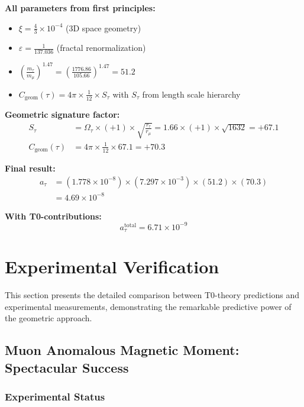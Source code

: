 \documentclass[12pt,a4paper]{article}
\numberwithin{equation}{section}
\newcommand{\xipar}{\xi}
\newcommand{\epsilonT}{\varepsilon}
\newcommand{\Cgeom}{C_{\text{geom}}}
\newcommand{\Omegafactor}{\Omega}
\begin{document}
	\textbf{All parameters from first principles:}
	\begin{itemize}
		\item $\xipar = \frac{4}{3} \times 10^{-4}$ (3D space geometry)
		\item $\epsilonT = \frac{1}{137.036}$ (fractal renormalization)
		\item $\left(\frac{m_\tau}{m_\mu}\right)^{1.47} = \left(\frac{1776.86}{105.66}\right)^{1.47} = 51.2$
		\item $\Cgeom(\tau) = 4\pi \times \frac{1}{12} \times S_\tau$ with $S_\tau$ from length scale hierarchy
	\end{itemize}
	
	\textbf{Geometric signature factor:}
	\begin{align}
		S_\tau &= \Omegafactor_\tau \times (+1) \times \sqrt{\frac{r_\tau}{r_\mu}} = 1.66 \times (+1) \times \sqrt{1632} = +67.1\\
		\Cgeom(\tau) &= 4\pi \times \frac{1}{12} \times 67.1 = +70.3
		\label{eq:tau_signature}
	\end{align}
	
	\textbf{Final result:}
	\begin{align}
		a_\tau &= (1.778 \times 10^{-8}) \times (7.297 \times 10^{-3}) \times (51.2) \times (70.3)\\
		&= 4.69 \times 10^{-8}
		\label{eq:tau_basic}
	\end{align}
	
	\textbf{With T0-contributions:}
	\begin{equation}
		a_\tau^{\text{total}} = 6.71 \times 10^{-9}
		\label{eq:tau_total}
	\end{equation}
	
	\section{Experimental Verification}
	
	This section presents the detailed comparison between T0-theory predictions and experimental measurements, demonstrating the remarkable predictive power of the geometric approach.
	
	\subsection{Muon Anomalous Magnetic Moment: Spectacular Success}
	
	\subsubsection{Experimental Status}
	
\end{document}
